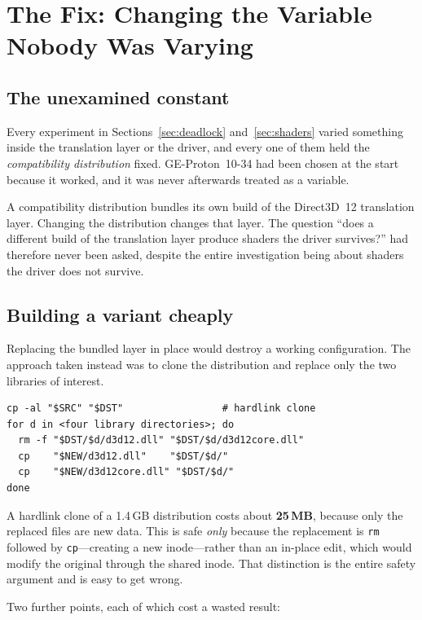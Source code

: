 \section{The Fix: Changing the Variable Nobody Was Varying}
\label{sec:fix}

\subsection{The unexamined constant}

Every experiment in Sections~\ref{sec:deadlock} and~\ref{sec:shaders} varied
something inside the translation layer or the driver, and every one of them held
the \emph{compatibility distribution} fixed. GE-Proton~10-34 had been chosen at
the start because it worked, and it was never afterwards treated as a variable.

A compatibility distribution bundles its own build of the Direct3D~12 translation
layer. Changing the distribution changes that layer. The question ``does a
different build of the translation layer produce shaders the driver survives?''
had therefore never been asked, despite the entire investigation being about
shaders the driver does not survive.

\subsection{Building a variant cheaply}

Replacing the bundled layer in place would destroy a working configuration. The
approach taken instead was to clone the distribution and replace only the two
libraries of interest.

\begin{lstlisting}
cp -al "$SRC" "$DST"                 # hardlink clone
for d in <four library directories>; do
  rm -f "$DST/$d/d3d12.dll" "$DST/$d/d3d12core.dll"
  cp    "$NEW/d3d12.dll"    "$DST/$d/"
  cp    "$NEW/d3d12core.dll" "$DST/$d/"
done
\end{lstlisting}

A hardlink clone of a 1.4\,GB distribution costs about \textbf{25\,MB}, because
only the replaced files are new data. This is safe \emph{only} because the
replacement is \verb|rm| followed by \verb|cp|---creating a new inode---rather
than an in-place edit, which would modify the original through the shared inode.
That distinction is the entire safety argument and is easy to get wrong.

Two further points, each of which cost a wasted result:

